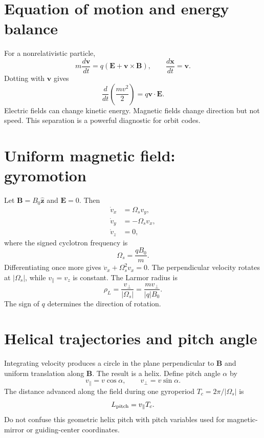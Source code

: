 \documentclass[11pt]{article}
\begin{document}
\section{Equation of motion and energy balance}

For a nonrelativistic particle,
\begin{equation}
m\frac{d\mathbf v}{dt}=q\left(\mathbf E+\mathbf v\times\mathbf B\right),
\qquad
\frac{d\mathbf x}{dt}=\mathbf v.
\end{equation}
Dotting with $\mathbf v$ gives
\begin{equation}
\frac{d}{dt}\left(\frac{mv^2}{2}\right)=q\mathbf v\cdot\mathbf E.
\end{equation}
Electric fields can change kinetic energy. Magnetic fields change direction but not speed. This separation is a powerful diagnostic for orbit codes.


\section{Uniform magnetic field: gyromotion}

Let $\mathbf B=B_0\hat{\mathbf z}$ and $\mathbf E=0$. Then
\begin{align}
\dot v_x&=\Omega_s v_y,\\
\dot v_y&=-\Omega_s v_x,\\
\dot v_z&=0,
\end{align}
where the signed cyclotron frequency is
\begin{equation}
\Omega_s=\frac{qB_0}{m}.
\end{equation}
Differentiating once more gives $\ddot v_x+\Omega_s^2v_x=0$. The perpendicular velocity rotates at $|\Omega_s|$, while $v_\parallel=v_z$ is constant. The Larmor radius is
\begin{equation}
\rho_L=\frac{v_\perp}{|\Omega_s|}=\frac{mv_\perp}{|q|B_0}.
\end{equation}
The sign of $q$ determines the direction of rotation.


\section{Helical trajectories and pitch angle}

Integrating velocity produces a circle in the plane perpendicular to $\mathbf B$ and uniform translation along $\mathbf B$. The result is a helix. Define pitch angle $\alpha$ by
\begin{equation}
v_\parallel=v\cos\alpha,\qquad v_\perp=v\sin\alpha.
\end{equation}
The distance advanced along the field during one gyroperiod $T_c=2\pi/|\Omega_s|$ is
\begin{equation}
L_{\rm pitch}=v_\parallel T_c.
\end{equation}
Do not confuse this geometric helix pitch with pitch variables used for magnetic-mirror or guiding-center coordinates.
\end{document}
